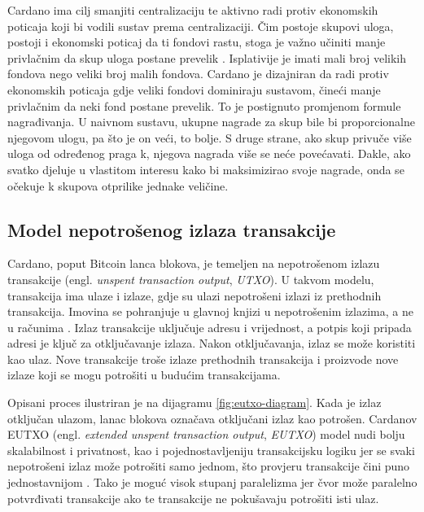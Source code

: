 \documentclass[times, utf8, diplomski]{fer}
\begin{document}
Cardano ima cilj smanjiti centralizaciju te aktivno radi protiv ekonomskih poticaja koji bi vodili sustav prema centralizaciji. Čim postoje skupovi uloga, postoji i ekonomski poticaj da ti fondovi rastu, stoga je važno učiniti manje privlačnim da skup uloga postane prevelik \cite{kerber2019ouroboros}. Isplativije je imati mali broj velikih fondova nego veliki broj malih fondova. Cardano je dizajniran da radi protiv ekonomskih poticaja gdje veliki fondovi dominiraju sustavom, čineći manje privlačnim da neki fond postane prevelik. To je postignuto promjenom formule nagrađivanja. U naivnom sustavu, ukupne nagrade za skup bile bi proporcionalne njegovom ulogu, pa što je on veći, to bolje. S druge strane, ako skup privuče više uloga od određenog praga k, njegova nagrada više se neće povećavati. Dakle, ako svatko djeluje u vlastitom interesu kako bi maksimizirao svoje nagrade, onda se očekuje k skupova otprilike jednake veličine.

\subsection{Model nepotrošenog izlaza transakcije}

Cardano, poput Bitcoin lanca blokova, je temeljen na nepotrošenom izlazu transakcije (engl. \emph{unspent transaction output}, \emph{UTXO}). U takvom modelu, transakcija ima ulaze i izlaze, gdje su ulazi nepotrošeni izlazi iz prethodnih transakcija. Imovina se pohranjuje u glavnoj knjizi u nepotrošenim izlazima, a ne u računima \cite{wood2014ethereum, buterin2013ethereum, larimer2013transactions}. Izlaz transakcije uključuje adresu i vrijednost, a potpis koji pripada adresi je ključ za otključavanje izlaza. Nakon otključavanja, izlaz se može koristiti kao ulaz. Nove transakcije troše izlaze prethodnih transakcija i proizvode nove izlaze koji se mogu potrošiti u budućim transakcijama. 

Opisani proces ilustriran je na dijagramu \ref{fig:eutxo-diagram}. Kada je izlaz otključan ulazom, lanac blokova označava otključani izlaz kao potrošen. Cardanov EUTXO (engl. \emph{extended unspent transaction output}, \emph{EUTXO}) model nudi bolju skalabilnost i privatnost, kao i pojednostavljeniju transakcijsku logiku jer se svaki nepotrošeni izlaz može potrošiti samo jednom, što provjeru transakcije čini puno jednostavnijom \cite{kerber2019ouroboros}. Tako je moguć visok stupanj paralelizma jer čvor može paralelno potvrđivati transakcije ako te transakcije ne pokušavaju potrošiti isti ulaz.
\end{document}
